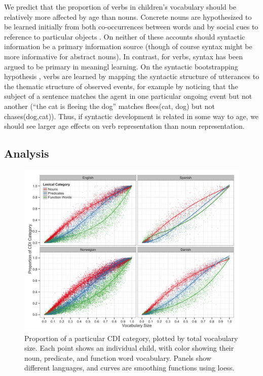 \documentclass[10pt,letterpaper]{article}
\begin{document}
We predict that the proportion of verbs in children's vocabulary should be relatively more affected by age than nouns. Concrete nouns are hypothesized to be learned initially from both co-occurrences between words \cite{yu2007b} and by social cues to reference to particular objects \cite{bloom2002}. On neither of these accounts should syntactic information be a primary information source (though of course syntax might be more informative for abstract nouns). In contrast, for verbs, syntax has been argued to be primary in meaningl learning. On the syntactic bootstrapping hypothesis \cite{gleitman1990,fisher1993}, verbs are learned by  mapping the syntactic structure of utterances to the thematic structure of observed events, for example by noticing that the subject of a sentence matches the agent in one particular ongoing event but not another (``the cat is fleeing the dog'' matches  {\sc flees(cat, dog)} but not {\sc chases(dog,cat)}). Thus, if syntactic development is related in some way to age, we should see larger age effects on verb representation than noun representation. 

\subsection{Analysis}


\begin{figure}[t!]
\begin{center}
\includegraphics[scale=1]{plots/composition.png}
\end{center}
\caption{\label{fig:beans} Proportion of a particular CDI category, plotted by total vocabulary size. Each point shows an individual child, with color showing their noun, predicate, and function word vocabulary. Panels show different languages, and curves are smoothing functions using loess.} 

\end{figure}
\end{document}
